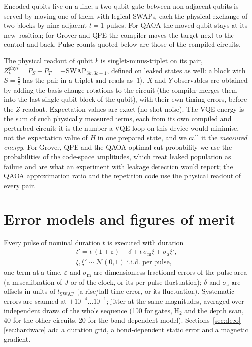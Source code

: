 \documentclass[reprint,aps,pra,amsmath,amssymb,superscriptaddress,letterpaper]{revtex4-2}
\newcommand{\ket}[1]{\lvert #1\rangle}
\newcommand{\Hz}{\mathrm{H}_2}
\newcommand{\tsw}{t_{\mathrm{SWAP}}}
\begin{document}
Encoded qubits live on a line; a two-qubit gate between non-adjacent qubits is
served by moving one of them with logical SWAPs, each the physical exchange of
two blocks by nine adjacent $t=1$ pulses. For QAOA the moved qubit stays at its
new position; for Grover and QPE the compiler moves the target next to the
control and back. Pulse counts quoted below are those of the compiled circuits.

The physical readout of qubit $k$ is singlet-minus-triplet on its pair,
$Z_k^{\mathrm{phys}}=P_S-P_T=-\mathrm{SWAP}_{3k,3k+1}$, defined on leaked
states as well: a block with $S=\tfrac32$ has the pair in a triplet and reads
as $\ket1$. $X$ and $Y$ observables are obtained by adding the basis-change rotations to the circuit (the compiler merges them into the last single-qubit block of the qubit), with their own timing errors, before the $Z$ readout.
Expectation values are exact (no shot noise). The VQE energy is the sum of such
physically measured terms, each from its own compiled and perturbed circuit;
it is the number a VQE loop on this device would minimise, not the expectation
value of $H$ in one prepared state, and we call it the \emph{measured energy}.
For Grover, QPE and the QAOA optimal-cut probability we use the probabilities of the code-space amplitudes, which treat leaked population as failure and are what an experiment with leakage detection would report; the QAOA approximation ratio and the repetition code use the physical readout of every pair.

\section{Error models and figures of merit}
\label{sec:model}

Every pulse of nominal duration $t$ is executed with duration
\begin{equation}
 \begin{gathered}
 t'=t\,(1+\varepsilon)+\delta+t\,\sigma_{\mathrm m}\xi+\sigma_{\mathrm a}\xi',\\
 \xi,\xi'\sim\mathcal N(0,1)\text{ i.i.d.\ per pulse},
 \end{gathered}
\end{equation}
one term at a time. $\varepsilon$ and $\sigma_{\mathrm m}$ are dimensionless
fractional errors of the pulse area (a miscalibration of $J$ or of the clock,
or its per-pulse fluctuation); $\delta$ and $\sigma_{\mathrm a}$ are offsets in
units of $\tsw$ (a rise/fall-time error, or its fluctuation). Systematic errors
are scanned at $\pm10^{-4}\dots10^{-1}$; jitter at the same magnitudes,
averaged over independent draws of the whole sequence (100 for gates, $\Hz$ and the depth scan, 40 for the other circuits, 20 for the bond-dependent model). Sections~\ref{sec:deco}--\ref{sec:hardware} add a
duration grid, a bond-dependent static error and a magnetic gradient.
\end{document}
